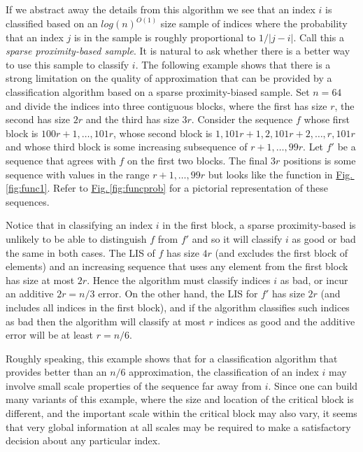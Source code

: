 \documentclass{acmsmall}
\newcommand{\Fig}[1]{\hyperref[fig:#1]{Fig.\,\ref*{fig:#1}}} %
\begin{document}
If we abstract away the details from this algorithm we see that an index $i$ is classified based on
an $log(n)^{O(1)}$ size sample of indices where the probability that an index $j$ is in the sample is roughly proportional
to $1/|j-i|$.   Call this a {\em sparse proximity-based sample}. It is natural to ask whether there is a better way to use this sample to classify $i$.
The following example shows that there is a strong limitation on the quality of approximation that can be provided by
a classification algorithm based on a sparse proximity-biased sample.
Set $n=64$ and divide the indices
into three contiguous blocks, where the first has size $r$, the second
has size $2r$ and the third has size $3r$.  Consider the sequence $f$ whose
first block is $100r+1,\ldots,101r$,
whose second block is
$1,101r+1,2,101r+2,\ldots, r,101r$ 
and whose third block is some increasing 
subsequence  of
$r+1,\ldots,99r$.  Let $f'$ be a sequence that
agrees with $f$ on the first two blocks. The
final $3r$ positions is some sequence with values in the range
$r+1,\ldots,99r$ but looks like the function in \Fig{func1}.
Refer to \Fig{funcprob} for a pictorial representation
of these sequences.

Notice that in classifying an index $i$ in the first block, a sparse proximity-based is unlikely to be able
to distinguish $f$ from $f'$ and so it will classify $i$ as good or bad the same in both cases.
The LIS of $f$ has size $4r$ (and excludes the first block
of elements) and an increasing sequence that uses any element from the first block has size
at most $2r$.  Hence the algorithm must classify indices $i$ as bad, or incur an additive $2r=n/3$ error.
On the other hand,  the LIS for $f'$ has size $2r$ (and includes all indices in the first block),
and if the algorithm classifies such indices as bad then the algorithm will classify at most $r$ indices as good
and the additive error will be at least $r=n/6$.

Roughly speaking, this example shows that for a classification algorithm that provides better than an $n/6$
approximation, the classification of an index $i$ may involve small scale properties of the sequence
far away from $i$.
Since one can build
many variants of this example, where the size and location of the
critical block is different, and the important scale within the critical
block may also vary, it seems that very global information at all scales
may be required to make a satisfactory decision about any particular index.
\end{document}

